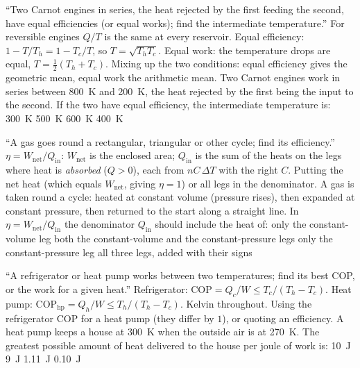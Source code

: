 {``Two Carnot engines in series, the heat rejected by the first feeding the second, have equal efficiencies
(or equal works); find the intermediate temperature.''}
{For reversible engines $Q/T$ is the same at every reservoir. Equal efficiency: $1-T/T_h=1-T_c/T$, so
$T=\sqrt{T_hT_c}$. Equal work: the temperature drops are equal, $T=\tfrac12(T_h+T_c)$.}
{Mixing up the two conditions: equal efficiency gives the geometric mean, equal work the arithmetic mean.}
{Two Carnot engines work in series between \SI{800}{K} and \SI{200}{K}, the heat rejected by the first being the
input to the second. If the two have equal efficiency, the intermediate temperature is:}
{\SI{300}{K}}
{\SI{500}{K}}
{\SI{600}{K}}
{\SI{400}{K}}

{``A gas goes round a rectangular, triangular or other cycle; find its efficiency.''}
{$\eta=W_{\text{net}}/Q_{\text{in}}$: $W_{\text{net}}$ is the enclosed area; $Q_{\text{in}}$ is the sum of the
heats on the legs where heat is \emph{absorbed} ($Q>0$), each from $nC\,\Delta T$ with the right $C$.}
{Putting the net heat (which equals $W_{\text{net}}$, giving $\eta=1$) or all legs in the denominator.}
{A gas is taken round a cycle: heated at constant volume (pressure rises), then expanded at constant pressure,
then returned to the start along a straight line. In $\eta=W_{\text{net}}/Q_{\text{in}}$ the denominator
$Q_{\text{in}}$ should include the heat of:}
{only the constant-volume leg}
{both the constant-volume and the constant-pressure legs}
{only the constant-pressure leg}
{all three legs, added with their signs}

{``A refrigerator or heat pump works between two temperatures; find its best COP, or the work for a given
heat.''}
{Refrigerator: $\text{COP}=Q_c/W\le T_c/(T_h-T_c)$. Heat pump: $\text{COP}_{\text{hp}}=Q_h/W\le T_h/(T_h-T_c)$.
Kelvin throughout.}
{Using the refrigerator COP for a heat pump (they differ by $1$), or quoting an efficiency.}
{A heat pump keeps a house at \SI{300}{K} when the outside air is at \SI{270}{K}. The greatest possible amount of
heat delivered to the house per joule of work is:}
{\SI{10}{J}}
{\SI{9}{J}}
{\SI{1.11}{J}}
{\SI{0.10}{J}}

